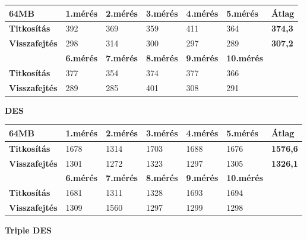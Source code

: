 \begin{center}
	
	
	\begin{tabular}{|p{2.4cm}|p{1.7cm}|p{1.7cm}|p{1.7cm}|p{1.7cm}|p{1.8cm}|p{1.2cm}|}
		\hline
		\textbf{64MB} & \textbf{1.mérés} & \textbf{2.mérés} & \textbf{3.mérés} & \textbf{4.mérés} & \textbf{5.mérés} & \textbf{Átlag} \\
		\hline
		\textbf{Titkosítás}&392&369&359&411&364&\textbf{374,3} \\
		\hline
		\textbf{Visszafejtés}&298&314&300&297&289&\textbf{307,2} \\
		\hline
		& \textbf{6.mérés} & \textbf{7.mérés} & \textbf{8.mérés} & \textbf{9.mérés} & \textbf{10.mérés} & \\
		\hline
		\textbf{Titkosítás}&377&354&374&377&366&\\
		\hline
		\textbf{Visszafejtés}&289&285&401&308&291&\\
		\hline
	\end{tabular}
\end{center}

\noindent \textbf{DES}

\begin{center}
	
	
	\begin{tabular}{|p{2.4cm}|p{1.6cm}|p{1.6cm}|p{1.7cm}|p{1.7cm}|p{1.8cm}|p{1.5cm}|}
		\hline
		\textbf{64MB} & \textbf{1.mérés} & \textbf{2.mérés} & \textbf{3.mérés} & \textbf{4.mérés} & \textbf{5.mérés} & \textbf{Átlag} \\
		\hline
		\textbf{Titkosítás}&1678&1314&1703&1688&1676&\textbf{1576,6} \\
		\hline
		\textbf{Visszafejtés}&1301&1272&1323&1297&1305&\textbf{1326,1} \\
		\hline
		& \textbf{6.mérés} & \textbf{7.mérés} & \textbf{8.mérés} & \textbf{9.mérés} & \textbf{10.mérés} & \\
		\hline
		\textbf{Titkosítás}&1681&1311&1328&1693&1694&\\
		\hline
		\textbf{Visszafejtés}&1309&1560&1297&1299&1298&\\
		\hline
	\end{tabular}
\end{center}

\noindent \textbf{Triple DES}

